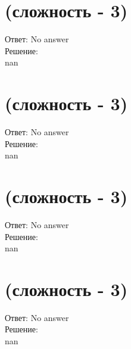 \documentclass[a4paper,10pt]{article}%
\begin{document}
%
\section{(сложность {-} 3)}%
\label{sec:( {-} 3)}%
\hspace{3ex} Ответ: No answer \\%
%
\hspace*{3ex} Решение: \\%
nan

%
\section{(сложность {-} 3)}%
\label{sec:( {-} 3)}%
\hspace{3ex} Ответ: No answer \\%
%
\hspace*{3ex} Решение: \\%
nan

%
\section{(сложность {-} 3)}%
\label{sec:( {-} 3)}%
\hspace{3ex} Ответ: No answer \\%
%
\hspace*{3ex} Решение: \\%
nan

%
\section{(сложность {-} 3)}%
\label{sec:( {-} 3)}%
\hspace{3ex} Ответ: No answer \\%
%
\hspace*{3ex} Решение: \\%
nan

%
\end{document}

